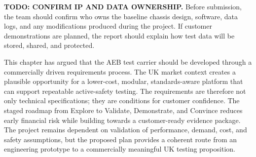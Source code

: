 \textbf{TODO: CONFIRM IP AND DATA OWNERSHIP.} Before submission, the team should confirm who owns the baseline chassis design, software, data logs, and any modifications produced during the project. If customer demonstrations are planned, the report should explain how test data will be stored, shared, and protected.

This chapter has argued that the AEB test carrier should be developed through a commercially driven requirements process. The UK market context creates a plausible opportunity for a lower-cost, modular, standards-aware platform that can support repeatable active-safety testing. The requirements are therefore not only technical specifications; they are conditions for customer confidence. The staged roadmap from Explore to Validate, Demonstrate, and Convince reduces early financial risk while building towards a customer-ready evidence package. The project remains dependent on validation of performance, demand, cost, and safety assumptions, but the proposed plan provides a coherent route from an engineering prototype to a commercially meaningful UK testing proposition.

